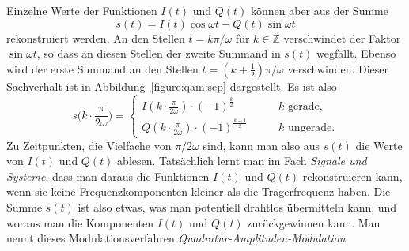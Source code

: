 Einzelne Werte der Funktionen $I(t)$ und $Q(t)$ können aber aus der Summe
\[
s(t)
=
I(t)\cos\omega t - Q(t)\sin\omega t
\]
rekonstruiert werden.
An den Stellen $t = k\pi/\omega$ für $k\in\mathbb Z$ verschwindet
der Faktor $\sin\omega t$,
so dass an diesen Stellen der zweite Summand in $s(t)$ wegfällt.
Ebenso wird der erste Summand an den Stellen
$t = (k+\frac12)\pi/\omega$ verschwinden.
Dieser Sachverhalt ist in Abbildung~\ref{figure:qam:sep} dargestellt.
Es ist also
\[
s\biggl(k\cdot \frac{\pi}{2\omega}\biggr)
=
\begin{cases}
I(k\cdot \frac{\pi}{2\omega})\cdot(-1)^{\frac{k}2}
&\qquad \text{$k$ gerade,}\\[5pt]
Q(k\cdot \frac{\pi}{2\omega})\cdot(-1)^{\frac{k-1}2}
&\qquad \text{$k$ ungerade.}
\end{cases}
\]
Zu Zeitpunkten, die Vielfache von $\pi/2\omega$ sind, kann man also aus
$s(t)$ die Werte von $I(t)$ und $Q(t)$ ablesen.
Tatsächlich lernt man im Fach {\em Signale und Systeme}, dass man daraus
die Funktionen $I(t)$ und $Q(t)$ rekonstruieren kann, wenn sie keine
Frequenzkomponenten kleiner als die Trägerfrequenz haben.
Die Summe $s(t)$ ist also etwas, was man potentiell drahtlos übermitteln
kann, und woraus man die Komponenten $I(t)$ und $Q(t)$ zurückgewinnen kann.
Man nennt dieses Modulationsverfahren {\em Quadratur-Amplituden-Modulation}.

